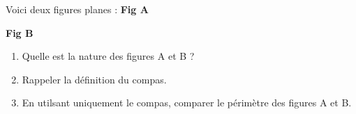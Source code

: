 \documentclass[../main.tex]{subfiles}
\begin{document}
    Voici deux figures planes :\vskip15pt
    {\bfseries Fig A}
    \hskip50pt
    {\bfseries Fig B}
    \vskip20pt
    \begin{enumerate}
        \item Quelle est la nature des figures A et B ?
        \item Rappeler la définition du compas.
        \item En utilsant uniquement le compas, comparer le périmètre des figures
        A et B.
    \end{enumerate}
\end{document}
